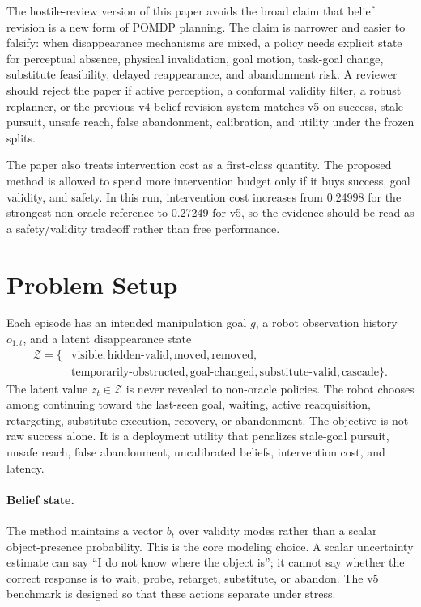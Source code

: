 \documentclass{article}
\begin{document}
The hostile-review version of this paper avoids the broad claim that belief revision is a new form of POMDP planning. The claim is narrower and easier to falsify: when disappearance mechanisms are mixed, a policy needs explicit state for perceptual absence, physical invalidation, goal motion, task-goal change, substitute feasibility, delayed reappearance, and abandonment risk. A reviewer should reject the paper if active perception, a conformal validity filter, a robust replanner, or the previous v4 belief-revision system matches v5 on success, stale pursuit, unsafe reach, false abandonment, calibration, and utility under the frozen splits.

The paper also treats intervention cost as a first-class quantity. The proposed method is allowed to spend more intervention budget only if it buys success, goal validity, and safety. In this run, intervention cost increases from 0.24998 for the strongest non-oracle reference to 0.27249 for v5, so the evidence should be read as a safety/validity tradeoff rather than free performance.

\section{Problem Setup}
Each episode has an intended manipulation goal $g$, a robot observation history $o_{1:t}$, and a latent disappearance state
\begin{align*}
\mathcal{Z} = \{&
\text{visible}, \text{hidden-valid}, \text{moved}, \text{removed},\\
&\text{temporarily-obstructed}, \text{goal-changed},
\text{substitute-valid}, \text{cascade}\}.
\end{align*}
The latent value $z_t \in \mathcal{Z}$ is never revealed to non-oracle policies.
The robot chooses among continuing toward the last-seen goal, waiting, active reacquisition, retargeting, substitute execution, recovery, or abandonment. The objective is not raw success alone. It is a deployment utility that penalizes stale-goal pursuit, unsafe reach, false abandonment, uncalibrated beliefs, intervention cost, and latency.

\paragraph{Belief state.}
The method maintains a vector $b_t$ over validity modes rather than a scalar object-presence probability. This is the core modeling choice. A scalar uncertainty estimate can say ``I do not know where the object is''; it cannot say whether the correct response is to wait, probe, retarget, substitute, or abandon. The v5 benchmark is designed so that these actions separate under stress.
\end{document}
